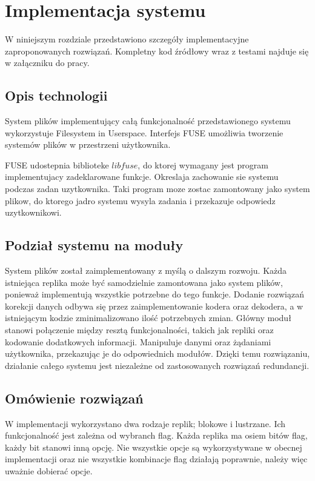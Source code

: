 \chapter{Implementacja systemu}
\thispagestyle{chapterBeginStyle}
W niniejszym rozdziale przedstawiono szczegóły implementacyjne zaproponowanych rozwiązań. Kompletny kod źródłowy wraz z testami najduje się w załączniku do pracy.

\section{Opis technologii}

System plików implementujący całą funkcjonalność przedstawionego systemu wykorzystuje Filesystem in Userspace. Interfejs FUSE umożliwia tworzenie systemów plików w przestrzeni użytkownika. 

FUSE udostepnia biblioteke $libfuse$, do ktorej wymagany jest program implementujacy zadeklarowane funkcje. Okreslaja zachowanie sie systemu podczas zadan uzytkownika. Taki program moze zostac zamontowany jako system plikow, do ktorego jadro systemu wysyla zadania i przekazuje odpowiedz uzytkownikowi.

\section{Podział systemu na moduły}
System plików został zaimplementowany z myślą o dalszym rozwoju. Każda istniejąca replika może być samodzielnie zamontowana jako system plików, ponieważ implementują wszystkie potrzebne do tego funkcje. Dodanie rozwiązań korekcji danych odbywa się przez zaimplementowanie kodera oraz dekodera, a w istniejącym kodzie zminimalizowano ilość potrzebnych zmian. Główny moduł stanowi połączenie między resztą funkcjonalności, takich jak repliki oraz kodowanie dodatkowych informacji. Manipuluje danymi oraz żądaniami użytkownika, przekazując je do odpowiednich modułów. Dzięki temu rozwiązaniu, działanie całego systemu jest niezależne od zastosowanych rozwiązań redundancji.

\section{Omówienie rozwiązań}
W implementacji wykorzystano dwa rodzaje replik; blokowe i lustrzane. Ich funkcjonalność jest zależna od wybranch flag. Każda replika ma osiem bitów flag, każdy bit stanowi inną opcję. Nie wszystkie opcje są wykorzystywane w obecnej implementacji oraz nie wszystkie kombinacje flag działają poprawnie, należy więc uważnie dobierać opcje. 
